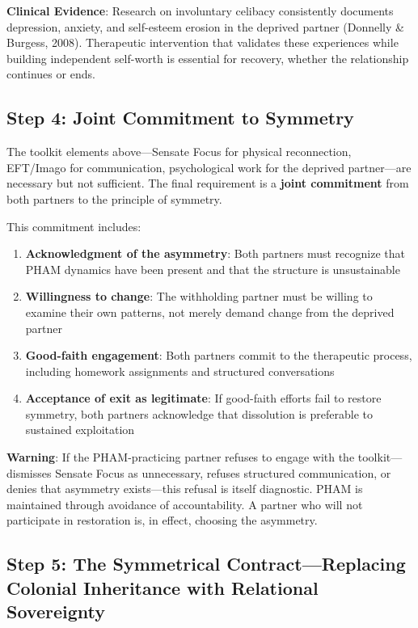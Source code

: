 \documentclass[12pt,openany]{book}
\numberwithin{equation}{chapter}
\begin{document}
\textbf{Clinical Evidence}: Research on involuntary celibacy consistently documents depression, anxiety, and self-esteem erosion in the deprived partner (Donnelly \& Burgess, 2008). Therapeutic intervention that validates these experiences while building independent self-worth is essential for recovery, whether the relationship continues or ends.

\subsection{Step 4: Joint Commitment to Symmetry}

The toolkit elements above---Sensate Focus for physical reconnection, EFT/Imago for communication, psychological work for the deprived partner---are necessary but not sufficient. The final requirement is a \textbf{joint commitment} from both partners to the principle of symmetry.

This commitment includes:

\begin{enumerate}
    \item \textbf{Acknowledgment of the asymmetry}: Both partners must recognize that PHAM dynamics have been present and that the structure is unsustainable
    \item \textbf{Willingness to change}: The withholding partner must be willing to examine their own patterns, not merely demand change from the deprived partner
    \item \textbf{Good-faith engagement}: Both partners commit to the therapeutic process, including homework assignments and structured conversations
    \item \textbf{Acceptance of exit as legitimate}: If good-faith efforts fail to restore symmetry, both partners acknowledge that dissolution is preferable to sustained exploitation
\end{enumerate}

\textbf{Warning}: If the PHAM-practicing partner refuses to engage with the toolkit---dismisses Sensate Focus as unnecessary, refuses structured communication, or denies that asymmetry exists---this refusal is itself diagnostic. PHAM is maintained through avoidance of accountability. A partner who will not participate in restoration is, in effect, choosing the asymmetry.

\subsection{Step 5: The Symmetrical Contract---Replacing Colonial Inheritance with Relational Sovereignty}
\end{document}
